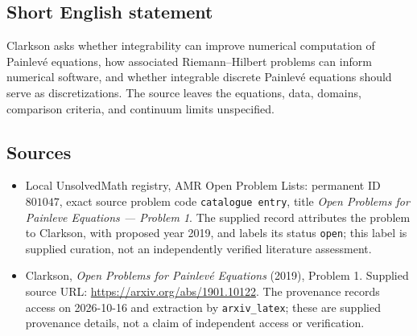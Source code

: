 \documentclass[11pt]{article}
\begin{document}
\subsection{Short English statement}
Clarkson asks whether integrability can improve numerical computation of Painlev\'e equations, how associated Riemann--Hilbert problems can inform numerical software, and whether integrable discrete Painlev\'e equations should serve as discretizations. The source leaves the equations, data, domains, comparison criteria, and continuum limits unspecified.
\subsection{Sources}
\begin{itemize}
\item Local UnsolvedMath registry, AMR Open Problem Lists: permanent ID \(801047\), exact source problem code \texttt{catalogue entry}, title \emph{Open Problems for Painleve Equations --- Problem 1}. The supplied record attributes the problem to Clarkson, with proposed year 2019, and labels its status \texttt{open}; this label is supplied curation, not an independently verified literature assessment.
\item Clarkson, \emph{Open Problems for Painlev\'e Equations} (2019), Problem 1. Supplied source URL: \url{https://arxiv.org/abs/1901.10122}. The provenance records access on 2026-10-16 and extraction by \texttt{arxiv\_latex}; these are supplied provenance details, not a claim of independent access or verification.
\end{itemize}
\end{document}
